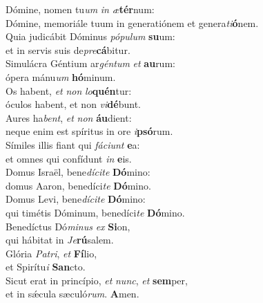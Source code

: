 \oddverse Dómine, nomen tu\textit{um} \textit{in} \textit{æ}\textbf{tér}num:~\*\\
\oddverse Dómine, memoriále tuum in generatiónem et genera\textit{ti}\textbf{ó}nem.\\
\evenverse Quia judicábit Dóminus \textit{pó}\textit{pu}\textit{lum} \textbf{su}um:~\*\\
\evenverse et in servis suis de\textit{pre}\textbf{cá}bitur.\\
\oddverse Simulácra Géntium ar\textit{gén}\textit{tum} \textit{et} \textbf{au}rum:~\*\\
\oddverse ópera mánu\textit{um} \textbf{hó}minum.\\
\evenverse Os habent, \textit{et} \textit{non} \textit{lo}\textbf{quén}tur:~\*\\
\evenverse óculos habent, et non \textit{vi}\textbf{dé}bunt.\\
\oddverse Aures ha\textit{bent}, \textit{et} \textit{non} \textbf{áu}dient:~\*\\
\oddverse neque enim est spíritus in ore \textit{i}\textbf{psó}rum.\\
\evenverse Símiles illis fiant qui \textit{fá}\textit{ci}\textit{unt} \textbf{e}a:~\*\\
\evenverse et omnes qui confídunt \textit{in} \textbf{e}is.\\
\oddverse Domus Israël, bene\textit{dí}\textit{ci}\textit{te} \textbf{Dó}mino:~\*\\
\oddverse domus Aaron, benedíci\textit{te} \textbf{Dó}mino.\\
\evenverse Domus Levi, bene\textit{dí}\textit{ci}\textit{te} \textbf{Dó}mino:~\*\\
\evenverse qui timétis Dóminum, benedíci\textit{te} \textbf{Dó}mino.\\
\oddverse Benedíctus Dó\textit{mi}\textit{nus} \textit{ex} \textbf{Si}on,~\*\\
\oddverse qui hábitat in \textit{Je}\textbf{rú}salem.\\
\evenverse Glória \textit{Pa}\textit{tri}, \textit{et} \textbf{Fí}lio,~\*\\
\evenverse et Spirítu\textit{i} \textbf{San}cto.\\
\oddverse Sicut erat in princípio, \textit{et} \textit{nunc}, \textit{et} \textbf{sem}per,~\*\\
\oddverse et in sǽcula sæculó\textit{rum}. \textbf{A}men.\\
